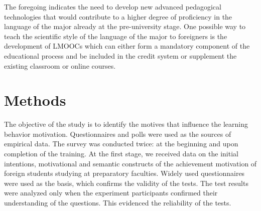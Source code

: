 \documentclass[english]{textolivre}
\begin{document}
The foregoing indicates the need to develop new advanced pedagogical technologies that would contribute to a higher degree of proficiency in the language of the major already at the pre-university stage. One possible way to teach the scientific style of the language of the major to foreigners is the development of LMOOCs which can either form a mandatory component of the educational process and be included in the credit system or supplement the existing classroom or online courses.


\section{Methods}\label{sec-modelo}
The objective of the study is to identify the motives that influence the learning behavior motivation. Questionnaires and polls were used as the sources of empirical data. The survey was conducted twice: at the beginning and upon completion of the training. At the first stage, we received data on the initial intentions, motivational and semantic constructs of the achievement motivation of foreign students studying at preparatory faculties. Widely used questionnaires were used as the basis, which confirms the validity of the tests. The test results were analyzed only when the experiment participants confirmed their understanding of the questions. This evidenced the reliability of the tests.
\end{document}
